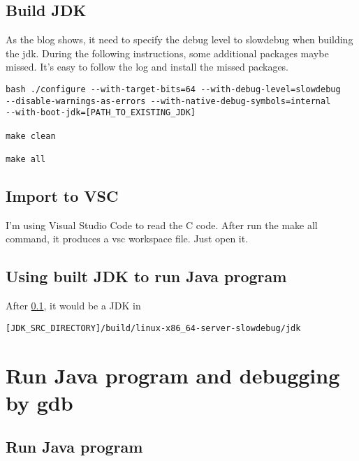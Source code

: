 \documentclass[12pt]{article}
\begin{document}
\subsection{Build JDK}
\label{subsec:build_jdk}

As the blog shows, it need to specify the debug level to slowdebug when building the jdk. During the following instructions, some additional packages maybe missed. It's easy to follow the log and install the missed packages.

\begin{verbatim}
bash ./configure --with-target-bits=64 --with-debug-level=slowdebug
--disable-warnings-as-errors --with-native-debug-symbols=internal
--with-boot-jdk=[PATH_TO_EXISTING_JDK]

make clean

make all
\end{verbatim}


\subsection{Import to VSC}
I'm using Visual Studio Code to read the C code. After run the make all command, it produces a vsc workspace file. Just open it.

\subsection{Using built JDK to run Java program}
After \ref{subsec:build_jdk}, it would be a JDK in
\begin{verbatim}
[JDK_SRC_DIRECTORY]/build/linux-x86_64-server-slowdebug/jdk
\end{verbatim}

\section{Run Java program and debugging by gdb}
\subsection{Run Java program}
\end{document}
